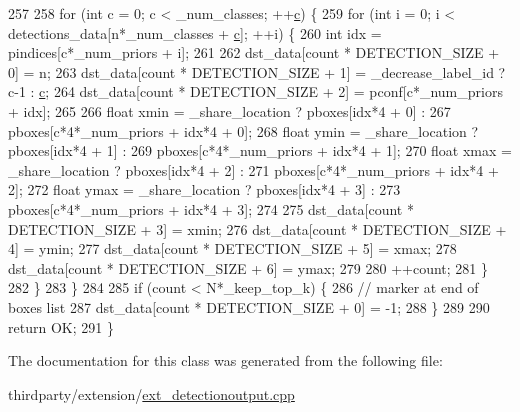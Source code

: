 \begin{DoxyCode}
257 
258             \textcolor{keywordflow}{for} (\textcolor{keywordtype}{int} c = 0; c < \_num\_classes; ++\hyperlink{CMakeCache_8txt_aac1d6a1710812201527c735f7c6afbaa}{c}) \{
259                 \textcolor{keywordflow}{for} (\textcolor{keywordtype}{int} i = 0; i < detections\_data[n*\_num\_classes + \hyperlink{CMakeCache_8txt_aac1d6a1710812201527c735f7c6afbaa}{c}]; ++i) \{
260                     \textcolor{keywordtype}{int} idx = pindices[c*\_num\_priors + i];
261 
262                     dst\_data[count * DETECTION\_SIZE + 0] = n;
263                     dst\_data[count * DETECTION\_SIZE + 1] = \_decrease\_label\_id ? c-1 : 
      \hyperlink{CMakeCache_8txt_aac1d6a1710812201527c735f7c6afbaa}{c};
264                     dst\_data[count * DETECTION\_SIZE + 2] = pconf[c*\_num\_priors + idx];
265 
266                     \textcolor{keywordtype}{float} xmin = \_share\_location ? pboxes[idx*4 + 0] :
267                                  pboxes[c*4*\_num\_priors + idx*4 + 0];
268                     \textcolor{keywordtype}{float} ymin = \_share\_location ? pboxes[idx*4 + 1] :
269                                  pboxes[c*4*\_num\_priors + idx*4 + 1];
270                     \textcolor{keywordtype}{float} xmax = \_share\_location ? pboxes[idx*4 + 2] :
271                                  pboxes[c*4*\_num\_priors + idx*4 + 2];
272                     \textcolor{keywordtype}{float} ymax = \_share\_location ? pboxes[idx*4 + 3] :
273                                  pboxes[c*4*\_num\_priors + idx*4 + 3];
274 
275                     dst\_data[count * DETECTION\_SIZE + 3] = xmin;
276                     dst\_data[count * DETECTION\_SIZE + 4] = ymin;
277                     dst\_data[count * DETECTION\_SIZE + 5] = xmax;
278                     dst\_data[count * DETECTION\_SIZE + 6] = ymax;
279 
280                     ++count;
281                 \}
282             \}
283         \}
284 
285         \textcolor{keywordflow}{if} (count < N*\_keep\_top\_k) \{
286             \textcolor{comment}{// marker at end of boxes list}
287             dst\_data[count * DETECTION\_SIZE + 0] = -1;
288         \}
289 
290         \textcolor{keywordflow}{return} OK;
291     \}
\end{DoxyCode}


The documentation for this class was generated from the following file\+:\begin{DoxyCompactItemize}
\item 
thirdparty/extension/\hyperlink{ext__detectionoutput_8cpp}{ext\+\_\+detectionoutput.\+cpp}\end{DoxyCompactItemize}
